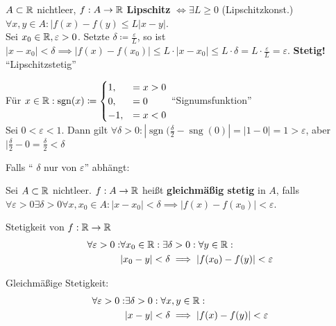 \begin{subexample}
	$ A\subset \mathbb{R}  $ nichtleer, $ f: A \to \mathbb{R}  $ \textbf{Lipschitz} $ \iff \exists L \geq  0 $ (Lipschitzkonst.) $ \forall x, y \in A: | f(x) - f(y) \leq  L|x - y| $.\\
	Sei $ x_0 \in \mathbb{R} , \varepsilon > 0 $. Setzte $ \delta \coloneqq \frac{ \varepsilon  }{ L }  $, so ist $ | x - x_0 | < \delta \implies |f(x) - f(x_0)| \leq L \cdot | x - x_0 | \leq  L \cdot \delta = L \cdot \frac{ \varepsilon  }{ L } = \varepsilon $. \textbf{Stetig!} ``Lipschitzstetig''
\end{subexample}

\begin{subexample}
	Für $ x \in \mathbb{R} : \operatorname{sgn}(x) \coloneqq \begin{cases}
		1, &= x > 0 \\
		0, &= 0 \\
		-1, &= x < 0 \\
	\end{cases} $ ``Signumsfunktion''\\
	Sei $ 0 < \varepsilon < 1 $. Dann gilt $ \forall \delta > 0: | \operatorname{sgn}(\frac{ \delta }{ 2 } - \operatorname{sng}(0) | = | 1 - 0 | = 1 > \varepsilon  $, aber $ | \frac{ \delta }{ 2 } - 0 = \frac{ \delta }{ 2 } < \delta $
\end{subexample}
Falls `` $ \delta $ nur von $ \varepsilon  $'' abhängt:
\begin{subdefinition}
	Sei $ A \subset \mathbb{R}  $ nichtleer. $ f: A \to \mathbb{R}  $ heißt \textbf{gleichmäßig stetig} in $ A $, falls\\
	$ \forall \varepsilon > 0\exists \delta > 0 \forall x, x_0 \in A : | x - x_0 | < \delta \implies  |f(x) - f(x_0) | < \varepsilon  $.
\end{subdefinition}


Stetigkeit von $ f: \mathbb{R}  \to \mathbb{R}  $ 
\begin{align*}
	\forall \varepsilon > 0 : &\forall x_0 \in \mathbb{R} : \exists \delta > 0 : \forall y \in \mathbb{R} :\\
	~& | x_0 - y | < \delta \implies |f(x_0) - f(y) | < \varepsilon 
\end{align*}

Gleichmäßige Stetigkeit:
\begin{align*}
	\forall \varepsilon > 0: &\exists \delta > 0 :\forall x, y \in \mathbb{R} :\\
	~&| x - y | < \delta \implies | f(x) - f(y) | < \varepsilon 
\end{align*}

